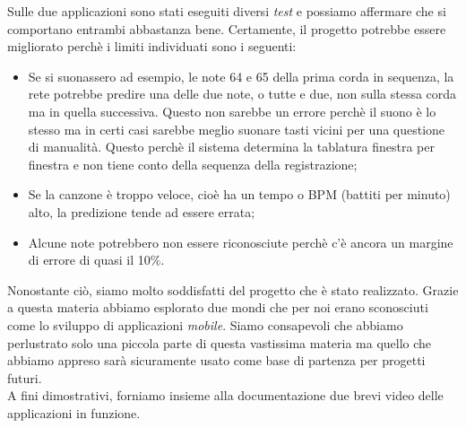 Sulle due applicazioni sono stati eseguiti diversi \textit{test} e possiamo affermare che si comportano entrambi abbastanza bene. Certamente, il progetto potrebbe essere migliorato perchè i limiti individuati sono i seguenti:
\begin{itemize}
		\item Se si suonassero ad esempio, le note 64 e 65 della prima corda in sequenza, la rete potrebbe predire una delle due note, o tutte e due, non sulla stessa corda ma in quella successiva. Questo non sarebbe un errore perchè il suono è lo stesso ma in certi casi sarebbe meglio suonare tasti vicini per una questione di manualità. Questo perchè il sistema determina la tablatura finestra per finestra e non tiene conto della sequenza della registrazione;
		\item Se la canzone è troppo veloce, cioè ha un tempo o BPM (battiti per minuto) alto, la predizione tende ad essere errata;
		\item Alcune note potrebbero non essere riconosciute perchè c'è ancora un margine di errore di quasi il 10\%.
	\end{itemize}
Nonostante ciò, siamo molto soddisfatti del progetto che è stato realizzato. Grazie a questa materia abbiamo esplorato due mondi che per noi erano sconosciuti come lo sviluppo di applicazioni \textit{mobile}. Siamo consapevoli che abbiamo perlustrato solo una piccola parte di questa vastissima materia ma quello che abbiamo appreso sarà sicuramente usato come base di partenza per progetti futuri.\\
\newline
A fini dimostrativi, forniamo insieme alla documentazione due brevi video delle applicazioni in funzione.